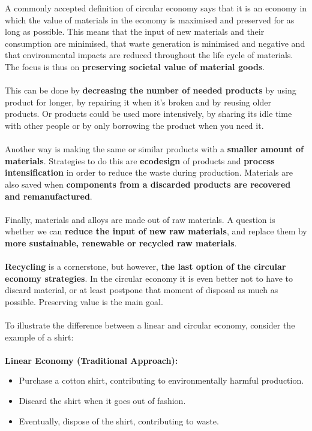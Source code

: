 \documentclass[../summary.tex]{subfiles}
\begin{document}
A commonly accepted definition of circular economy says that it is an economy in which the value of materials in the economy is maximised and preserved for as long as possible. This means that the input of new materials and their consumption are minimised, that waste generation is minimised and negative and that environmental impacts are reduced throughout the life cycle of materials. The focus is thus on \textbf{preserving societal value of material goods}.
\\\\
This can be done by \textbf{decreasing the number of needed products} by using product for longer, by repairing it when it's broken and by reusing older products. Or products could be used more intensively, by sharing its idle time with other people or by only borrowing the product when you need it.
\\\\
Another way is making the same or similar products with a \textbf{smaller amount of materials}. Strategies to do this are \textbf{ecodesign} of products and \textbf{process intensification} in order to reduce the waste during production. Materials are also saved when \textbf{components from a discarded products are recovered and remanufactured}.
\\\\
Finally, materials and alloys are made out of raw materials. A question is whether we can \textbf{reduce the input of new raw materials}, and replace them by \textbf{more sustainable, renewable or recycled raw materials}.
\\\\
\textbf{Recycling} is a cornerstone, but however, \textbf{the last option of the circular economy strategies}. In the circular economy it is even better not to have to discard material, or at least postpone that moment of disposal as much as possible. Preserving value is the main goal.
\\\\
To illustrate the difference between a linear and circular economy, consider the example of a shirt:
\\\\
\textbf{Linear Economy (Traditional Approach):}
\begin{itemize}
	\itemsep0em
	\item Purchase a cotton shirt, contributing to environmentally harmful production.
	\item Discard the shirt when it goes out of fashion.
	\item Eventually, dispose of the shirt, contributing to waste.
\end{itemize}
\end{document}
